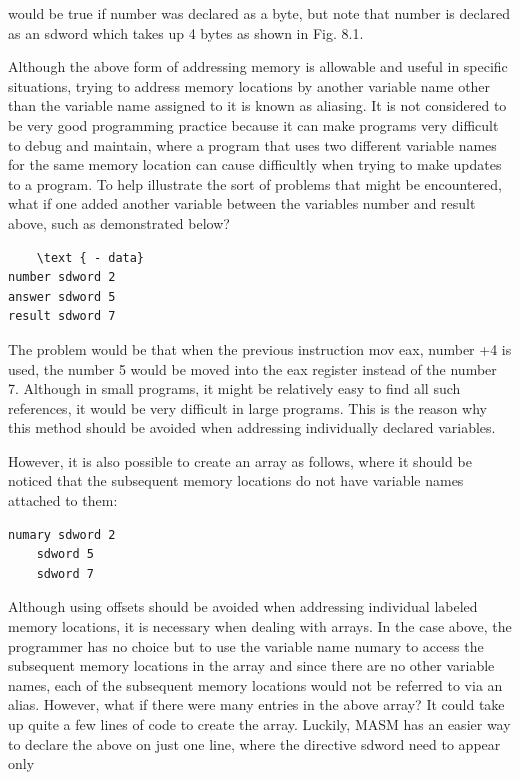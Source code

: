 \documentclass[10pt]{article}
\begin{document}
would be true if number was declared as a byte, but note that number is declared as an sdword which takes up 4 bytes as shown in Fig. 8.1.

Although the above form of addressing memory is allowable and useful in specific situations, trying to address memory locations by another variable name other than the variable name assigned to it is known as aliasing. It is not considered to be very good programming practice because it can make programs very difficult to debug and maintain, where a program that uses two different variable names for the same memory location can cause difficultly when trying to make updates to a program. To help illustrate the sort of problems that might be encountered, what if one added another variable between the variables number and result above, such as demonstrated below?

\begin{verbatim}
    \text { - data}
number sdword 2
answer sdword 5
result sdword 7
\end{verbatim}

The problem would be that when the previous instruction mov eax, number +4 is used, the number 5 would be moved into the eax register instead of the number 7. Although in small programs, it might be relatively easy to find all such references, it would be very difficult in large programs. This is the reason why this method should be avoided when addressing individually declared variables.

However, it is also possible to create an array as follows, where it should be noticed that the subsequent memory locations do not have variable names attached to them:

\begin{verbatim}
numary sdword 2
    sdword 5
    sdword 7
\end{verbatim}

Although using offsets should be avoided when addressing individual labeled memory locations, it is necessary when dealing with arrays. In the case above, the programmer has no choice but to use the variable name numary to access the subsequent memory locations in the array and since there are no other variable names, each of the subsequent memory locations would not be referred to via an alias. However, what if there were many entries in the above array? It could take up quite a few lines of code to create the array. Luckily, MASM has an easier way to declare the above on just one line, where the directive sdword need to appear only
\end{document}
